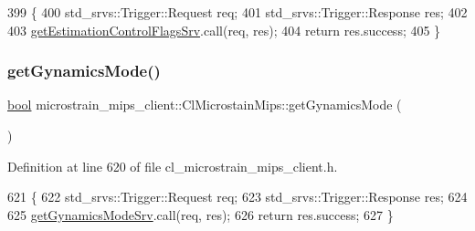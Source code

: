 \begin{DoxyCode}
399     \{
400         std\_srvs::Trigger::Request req;
401         std\_srvs::Trigger::Response res;
402 
403         \hyperlink{classmicrostrain__mips__client_1_1ClMicrostainMips_a8f9c894cf9a370cabb071df0c5aaad00}{getEstimationControlFlagsSrv}.call(req, res);
404         \textcolor{keywordflow}{return} res.success;
405     \}
\end{DoxyCode}
\mbox{\label{classmicrostrain__mips__client_1_1ClMicrostainMips_a980e4aa2896a911141a219a19f41c80c}} 
\subsubsection{\texorpdfstring{get\+Gynamics\+Mode()}{getGynamicsMode()}}
{\footnotesize\ttfamily \hyperlink{classbool}{bool} microstrain\+\_\+mips\+\_\+client\+::\+Cl\+Microstain\+Mips\+::get\+Gynamics\+Mode (\begin{DoxyParamCaption}{ }\end{DoxyParamCaption})\hspace{0.3cm}{\ttfamily [inline]}}



Definition at line 620 of file cl\+\_\+microstrain\+\_\+mips\+\_\+client.\+h.


\begin{DoxyCode}
621     \{
622         std\_srvs::Trigger::Request req;
623         std\_srvs::Trigger::Response res;
624 
625         \hyperlink{classmicrostrain__mips__client_1_1ClMicrostainMips_a8be11f7821b9951e39bf2df21b9b68be}{getGynamicsModeSrv}.call(req, res);
626         \textcolor{keywordflow}{return} res.success;
627     \}
\end{DoxyCode}
\mbox{\label{classmicrostrain__mips__client_1_1ClMicrostainMips_adc09d9048e3289f309bd10f3422dd03d}} 
